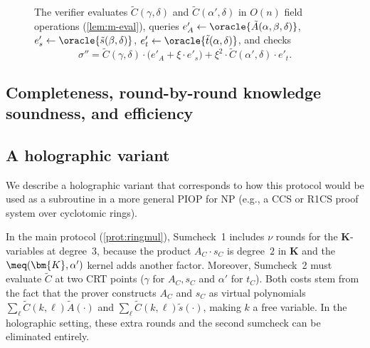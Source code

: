 \begin{figure}[H]
\begin{algorithm}[H]
\begin{algorithmic}[1]
    \STATE The verifier evaluates $\tilde{C}(\gamma, \delta)$ and $\tilde{C}(\alpha', \delta)$ in $O(n)$ field operations (\cref{lem:m-eval}), queries $e'_A \gets \oracle{\tilde{A}(\alpha, \beta, \delta)}$, $e'_s \gets \oracle{\tilde{s}(\beta, \delta)}$, $e'_t \gets \oracle{\tilde{t}(\alpha, \delta)}$, and checks
    \[
        \sigma'' = \tilde{C}(\gamma, \delta) \cdot \big(e'_A + \xi \cdot e'_s\big) + \xi^{2} \cdot \tilde{C}(\alpha', \delta) \cdot e'_t.
    \]
\end{algorithmic}
\end{algorithm}
\end{figure}

\subsection{Completeness, round-by-round knowledge soundness, and efficiency}
\label{sec:ring-pior-ks}




\subsection{A holographic variant}
\label{sec:holographic-piop}

We describe a holographic variant that corresponds to how this protocol would be used as a subroutine in a more general PIOP for NP (e.g., a CCS or R1CS proof system over cyclotomic rings).

In the main protocol (\cref{prot:ringmul}), Sumcheck~1 includes $\nu$ rounds for the $\bm{K}$-variables at degree~$3$, because the product $A_C \cdot s_C$ is degree~$2$ in $\bm{K}$ and the $\meq(\bm{K},\alpha')$ kernel adds another factor. Moreover, Sumcheck~2 must evaluate $\tilde{C}$ at two CRT points ($\gamma$ for $A_C,s_C$ and $\alpha'$ for $t_C$). Both costs stem from the fact that the prover constructs $A_C$ and $s_C$ as virtual polynomials $\sum_\ell \tilde{C}(k,\ell)\tilde{A}(\cdot)$ and $\sum_\ell \tilde{C}(k,\ell)\tilde{s}(\cdot)$, making $k$ a free variable. In the holographic setting, these extra rounds and the second sumcheck can be eliminated entirely.

